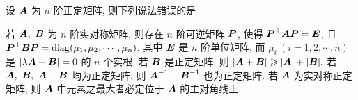 \begin{example}
    设 $\vb*{A}$ 为 $n$ 阶正定矩阵, 则下列说法错误的是
    \begin{tasks}
        \task 若 $\vb*{A},~\vb*{B}$ 为 $n$ 阶实对称矩阵, 则存在 $n$ 阶可逆矩阵 $\vb*{P}$, 使得 $\vb*{P}^\top\vb*{AP}=\vb*{E}$, 且 $\vb*{P}^\top\vb*{BP}=\operatorname{diag} (\mu_1, \mu_2, \cdots, \mu_n)$, 其中 $\vb*{E}$ 是 $n$ 阶单位矩阵, 而 $\mu_i~(i=1,2, \cdots, n)$ 是 $|\lambda\vb*{A}-\vb*{B}|=0$ 的 $n$ 个实根.
        \task 若 $\vb*{B}$ 是正定矩阵, 则 $|\vb*{A}+\vb*{B}|\geqslant|\vb*{A}|+|\vb*{B}|.$
        \task 若 $\vb*{A},~\vb*{B},~\vb*{A}-\vb*{B}$ 均为正定矩阵, 则 $\vb*{A}^{-1}-\vb*{B}^{-1}$ 也为正定矩阵.
        \task 若 $\vb*{A}$ 为实对称正定矩阵, 则 $\vb*{A}$ 中元素之最大者必定位于 $\vb*{A}$ 的主对角线上.
    \end{tasks}
\end{example}
